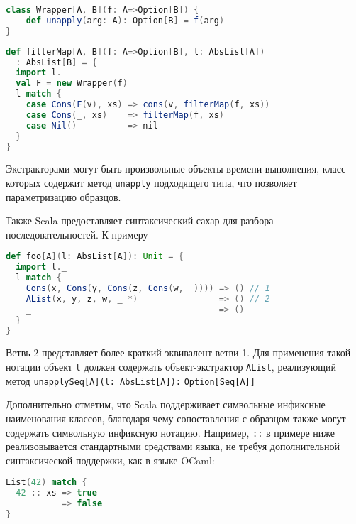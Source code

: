\noindent
\begin{minipage}{\linewidth}
\begin{lstlisting}[language=scala]
class Wrapper[A, B](f: A=>Option[B]) {
    def unapply(arg: A): Option[B] = f(arg)
}
\end{lstlisting}
\end{minipage}

\noindent
\begin{minipage}{\linewidth}
\begin{lstlisting}[language=scala]
def filterMap[A, B](f: A=>Option[B], l: AbsList[A])
  : AbsList[B] = {
  import l._
  val F = new Wrapper(f)
  l match {
    case Cons(F(v), xs) => cons(v, filterMap(f, xs))
    case Cons(_, xs)    => filterMap(f, xs)
    case Nil()          => nil
  }
}
\end{lstlisting}
\end{minipage}

Экстракторами могут быть произвольные объекты времени выполнения, класс которых содержит метод \lstinline|unapply| подходящего типа, что позволяет параметризацию образцов.

Также Scala предоставляет синтаксический сахар для разбора последовательностей. К примеру

\noindent
\begin{minipage}{\linewidth}
\begin{lstlisting}[language=scala]
def foo[A](l: AbsList[A]): Unit = {
  import l._
  l match {
    Cons(x, Cons(y, Cons(z, Cons(w, _)))) => () // 1
    AList(x, y, z, w, _ *)                => () // 2
    _                                     => ()
  }
}
\end{lstlisting}
\end{minipage}

Ветвь 2 представляет более краткий эквивалент ветви 1. Для применения такой нотации объект \lstinline|l| должен содержать объект-экстрактор \lstinline|AList|, реализующий метод \lstinline[breaklines]|unapplySeq[A](l: AbsList[A]):| \lstinline[breaklines]|Option[Seq[A]]|

Дополнительно отметим, что Scala поддерживает символьные инфиксные наименования классов, благодаря чему сопоставления с образцом также могут содержать символьную инфиксную нотацию. Например, \lstinline|::| в примере ниже реализовывается стандартными средствами языка, не требуя дополнительной синтаксической поддержки, как в языке OCaml:

\noindent
\raggedbottom
\begin{minipage}{\linewidth}
\begin{lstlisting}[language=scala]
List(42) match {
  42 :: xs => true
  _        => false 
}
\end{lstlisting}
\end{minipage}

